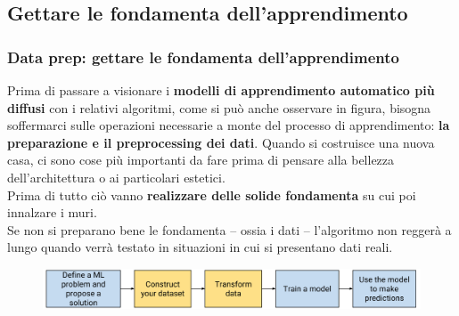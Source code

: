 \subsection[Gettare le fondamenta dell'apprendimento]{Gettare le fondamenta dell'apprendimento}
\begin{frame}
	\frametitle{Data prep: gettare le fondamenta dell'apprendimento}
	
		Prima di passare a visionare i \textbf{modelli di apprendimento automatico più diffusi} con i relativi algoritmi, come si può anche osservare in figura, bisogna soffermarci sulle operazioni necessarie a monte del processo di apprendimento: \textbf{la preparazione e il preprocessing dei dati}.
		\newlinedouble
		Quando si costruisce una nuova casa, ci sono cose più importanti da fare prima di pensare alla bellezza dell'architettura o ai particolari estetici.\\
		Prima di tutto ciò vanno \textbf{realizzare delle solide fondamenta} su cui poi innalzare i muri.\\
		Se non si preparano bene le fondamenta – ossia i dati – l'algoritmo non reggerà a lungo quando verrà testato in situazioni in cui si presentano dati reali.
		\begin{figure}[!htbp]
			\centering
			\includegraphics[width=0.9\linewidth]{images/data_prep/build_the_foundation/5phases.png}
		\end{figure}

		

\end{frame}




